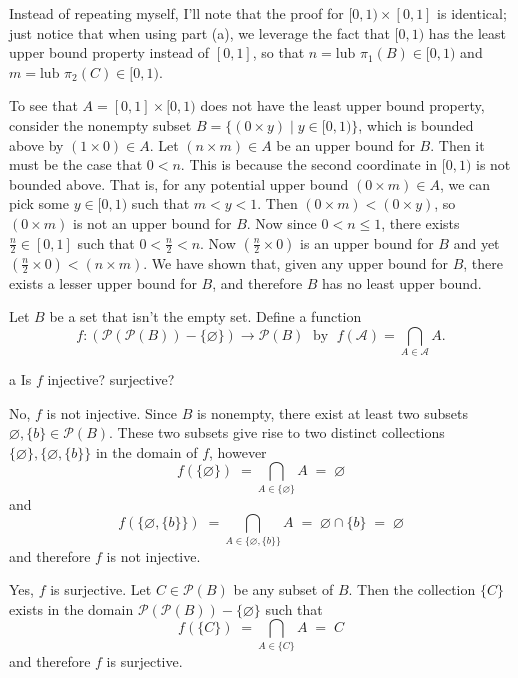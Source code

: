 \documentclass[11pt]{article}
\begin{document}
\begin{solution}
  Instead of repeating myself, I'll note that the proof for $[0,1) \times [0, 1]$ is
  identical; just notice that when using part (a), we leverage the fact that $[0,1)$ has
  the least upper bound property instead of $[0,1]$, so that $n = \text{lub } \pi_1(B) \in
  [0, 1)$ and $m = \text{lub } \pi_2(C) \in [0, 1)$.

  To see that $A = [0, 1] \times [0, 1)$ does not have the least upper bound property,
  consider the nonempty subset $B = \{ (0 \times y) \mid y \in [0, 1) \}$, which is
  bounded above by $(1 \times 0) \in A$. Let
  $(n \times m) \in A$ be an upper bound for $B$. Then it
  must be the case that $0 < n$. This is because the second coordinate in $[0, 1)$ is not
  bounded above.  That is, for any potential upper bound $(0 \times m) \in A$, we can pick
  some $y \in [0, 1)$ such that $m < y < 1$. Then $(0 \times m) < (0 \times y)$, so $(0
  \times m)$ is not an upper bound for $B$. Now since $0 < n \le 1$, there exists $\frac{n}{2}
  \in [0, 1]$ such that $0 < \frac{n}{2} < n$. Now $(\frac{n}{2} \times 0)$ is
  an upper bound for $B$ and yet $(\frac{n}{2} \times 0) < (n \times m)$. We have shown
  that, given any upper bound for $B$, there exists a lesser upper bound for $B$, and
  therefore $B$ has no least upper bound.
\end{solution}


\begin{ex'}
  Let $B$ be a set that isn't the empty set. Define a function
  $$f : (\mathscr{P}(\mathscr{P}(B)) - \{\varnothing\}) \to \mathscr{P}(B)
  \;\text{ by }\;
  f(\mathcal{A}) = \bigcap_{A \in \mathcal{A}} A.$$
\end{ex'}

\begin{p}{a}
  Is $f$ injective? surjective?
\end{p}

\begin{solution}
  No, $f$ is not injective. Since $B$ is nonempty, there exist at least two
  subsets $\varnothing, \{b\} \in \mathscr{P}(B).$ These two subsets give rise
  to two distinct collections $\{\varnothing\}, \{\varnothing, \{b\}\}$ in the domain of
  $f$, however
  \[
    f(\{\varnothing\}) \;= \bigcap_{A \in \{\varnothing\}} A \;=\; \varnothing \label{eq1}
  \]
  and
  \[
  f(\{\varnothing, \{b\}\})
    \;= \bigcap_{A \in \{\varnothing, \{b\}\}} A
    \;=\; \varnothing \cap \{b\} \;=\; \varnothing \label{eq2}
  \]
  and therefore $f$ is not injective.

  Yes, $f$ is surjective. Let $C \in \mathscr{P}(B)$ be any subset of $B$. Then
  the collection $\{C\}$ exists in the domain $\mathscr{P}(\mathscr{P}(B)) -
  \{\varnothing\}$ such that
  $$ f(\{C\}) \;= \bigcap_{A \in \{C\}} A \;=\; C $$
  and therefore $f$ is surjective.
\end{solution}
\end{document}
